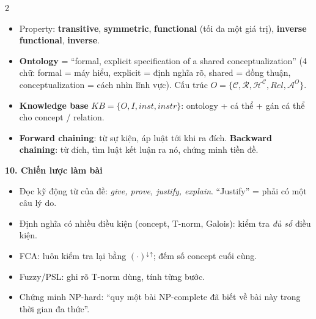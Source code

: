 \documentclass[10pt]{article}
\newcommand{\kw}[1]{\textbf{#1}}
\newcommand{\sect}[1]{\par\vspace{6pt}\noindent\colorbox{h1}{\parbox{\dimexpr\linewidth-2\fboxsep}{\large\bfseries\color{white}#1}}\par\vspace{2pt}}
\newcommand{\up}{^{\uparrow}}
\newcommand{\dn}{^{\downarrow}}
\begin{document}
\begin{multicols}{2}
\begin{itemize}
\item Property: \kw{transitive}, \kw{symmetric}, \kw{functional} (tối đa một giá trị), \kw{inverse functional}, \kw{inverse}.
\item \kw{Ontology} = ``formal, explicit specification of a shared conceptualization'' (4 chữ: formal = máy hiểu, explicit = định nghĩa rõ, shared = đồng thuận, conceptualization = cách nhìn lĩnh vực). Cấu trúc $O=\{\mathcal C,\mathcal R,\mathcal H^{\mathcal C},\mathit{Rel},\mathcal A^O\}$.
\item \kw{Knowledge base} $KB=\{O,I,inst,instr\}$: ontology + cá thể + gán cá thể cho concept / relation.
\item \kw{Forward chaining}: từ sự kiện, áp luật tới khi ra đích. \kw{Backward chaining}: từ đích, tìm luật kết luận ra nó, chứng minh tiền đề.
\end{itemize}

\sect{10. Chiến lược làm bài}
\begin{itemize}
\item Đọc kỹ động từ của đề: \emph{give, prove, justify, explain}. ``Justify'' = phải có một câu lý do.
\item Định nghĩa có nhiều điều kiện (concept, T-norm, Galois): kiểm tra \emph{đủ số} điều kiện.
\item FCA: luôn kiểm tra lại bằng $(\cdot)\dn{}\up$; đếm số concept cuối cùng.
\item Fuzzy/PSL: ghi rõ T-norm dùng, tính từng bước.
\item Chứng minh NP-hard: ``quy một bài NP-complete đã biết về bài này trong thời gian đa thức''.
\end{itemize}
\end{multicols}
\end{document}
